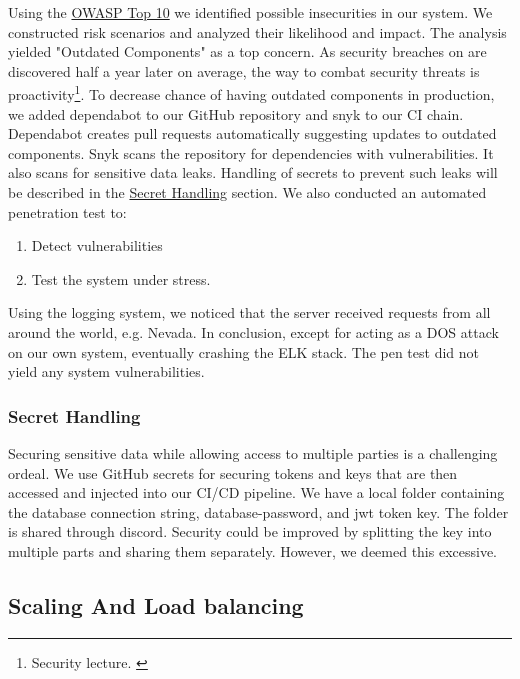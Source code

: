 Using the \href{https://owasp.org/Top10/}{OWASP Top 10} we identified possible insecurities in our system. We constructed risk scenarios and analyzed their likelihood and impact. 
The analysis yielded "Outdated Components" as a top concern. As security breaches on are discovered half a year later on average, the way to combat security threats is proactivity\footnote{Security lecture. \cite{securitylecture}}. To decrease chance of having outdated components in production, we added dependabot to our GitHub repository and snyk to our CI chain. Dependabot creates pull requests automatically suggesting updates to outdated components. Snyk scans the repository for dependencies with vulnerabilities. It also scans for sensitive data leaks. Handling of secrets to prevent such leaks will be described in the \hyperref[subsubsec:secrets]{Secret Handling} section.
We also conducted an automated penetration test to:
\begin{enumerate}
    \item Detect vulnerabilities
    \item Test the system under stress.
\end{enumerate}
Using the logging system, we noticed that the server received requests from all around the world, e.g. Nevada. In conclusion, except for acting as a DOS attack on our own system, eventually crashing the ELK stack. The pen test did not yield any system vulnerabilities.

\subsubsection{Secret Handling}
\label{subsubsec:secrets}
Securing sensitive data while allowing access to multiple parties is a challenging ordeal. We use GitHub secrets for securing tokens and keys that are then accessed and injected into our CI/CD pipeline. We have a local folder containing the database connection string, database-password, and jwt token key. The folder is shared through discord. Security could be improved by splitting the key into multiple parts and sharing them separately. However, we deemed this excessive.
\clearpage
\subsection{Scaling And Load balancing}
\label{subsec:scaling}

